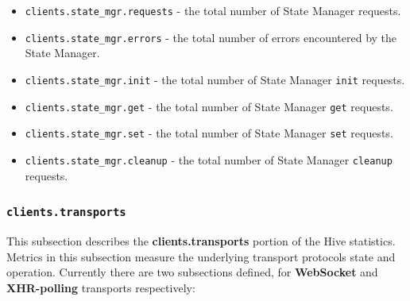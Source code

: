 \documentclass[a4paper]{article}
\begin{document}
\begin{itemize}
\item \texttt{clients.state\_mgr.requests} - the total number of State Manager requests.
\item \texttt{clients.state\_mgr.errors} - the total number of errors encountered by the State Manager.
\item \texttt{clients.state\_mgr.init} - the total number of State Manager \texttt{init} requests.
\item \texttt{clients.state\_mgr.get} - the total number of State Manager \texttt{get} requests.
\item \texttt{clients.state\_mgr.set} - the total number of State Manager \texttt{set} requests.
\item \texttt{clients.state\_mgr.cleanup} - the total number of State Manager \texttt{cleanup} requests.
\end{itemize}
\subsubsection{\texttt{clients.transports}}
\label{sec-4-2-8}

This subsection describes the \textbf{clients.transports} portion of the Hive statistics. Metrics in this subsection measure the underlying transport protocols state and operation. Currently there are two subsections defined, for \textbf{WebSocket} and \textbf{XHR-polling} transports respectively:
\end{document}
